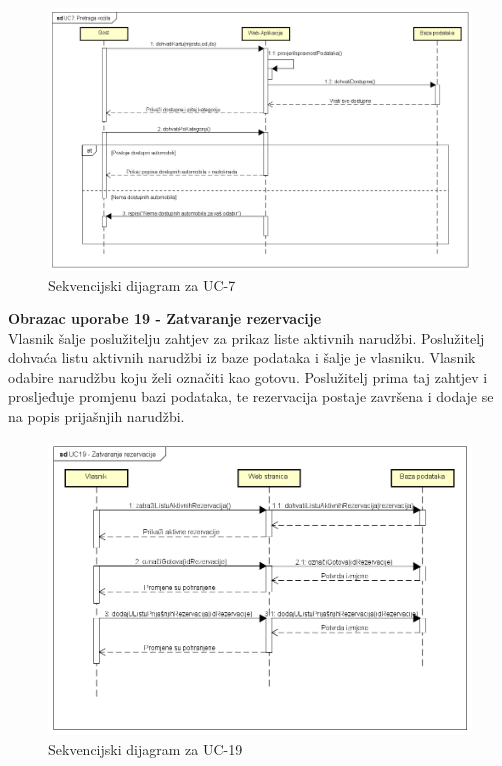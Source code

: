				\begin{figure}[hp]
                    \centering
                    \includegraphics[width=16cm]{dokumentacija/slike/UC7_Pretraga_vozila.png}
                    \caption{Sekvencijski dijagram za UC-7}
                    \label{fig:SD_UC7}
                \end{figure}
                
                \newpage\noindent\textbf{Obrazac uporabe 19 -  Zatvaranje rezervacije}\\
                
				\noindent Vlasnik šalje poslužitelju zahtjev za prikaz liste aktivnih narudžbi. Poslužitelj dohvaća listu aktivnih narudžbi iz baze podataka i šalje je vlasniku. Vlasnik odabire narudžbu koju želi označiti kao gotovu. Poslužitelj prima taj zahtjev i prosljeđuje promjenu bazi podataka, te rezervacija postaje 
                završena i dodaje se na popis prijašnjih narudžbi.
				
				\begin{figure}[hp]
                    \centering
                    \includegraphics[width=16cm]{dokumentacija/slike/UC19 _Zatvaranje_rezervacije.png}
                    \caption{Sekvencijski dijagram za UC-19}
                    \label{fig:SD_UC7}
                \end{figure}
				
